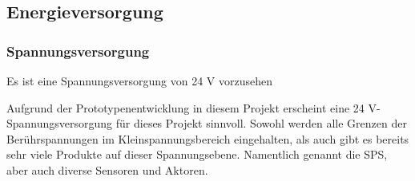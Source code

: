 \subsection{Energieversorgung}\label{sec:EV}
\subsubsection{Spannungsversorgung}
\begin{feat}
Es ist eine Spannungsversorgung von 24 V vorzusehen
\end{feat}
\begin{rem}[zu Anf. 08]
Aufgrund der Prototypenentwicklung in diesem Projekt erscheint eine 24 V-Spannungsversorgung für dieses Projekt sinnvoll. Sowohl werden alle Grenzen der Berührspannungen im Kleinspannungsbereich eingehalten, als auch gibt es bereits sehr viele Produkte auf dieser Spannungsebene. Namentlich genannt die SPS, aber auch diverse Sensoren und Aktoren.
\end{rem}
